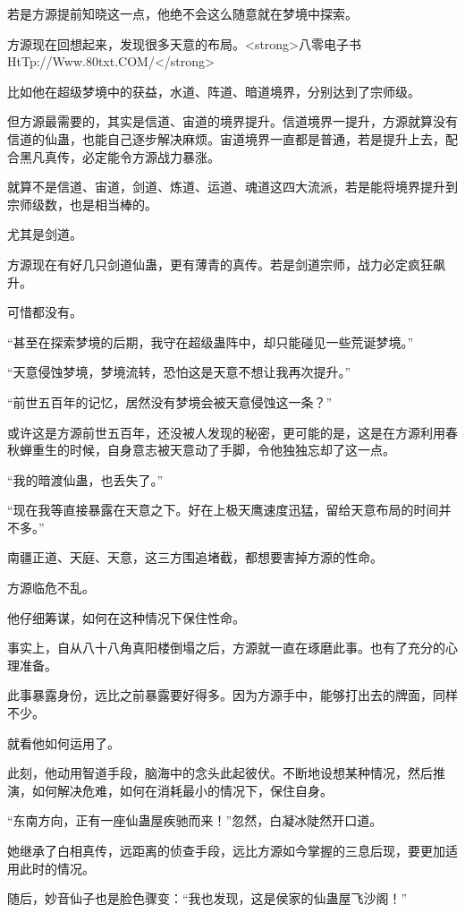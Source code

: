 \begin{this_body}
若是方源提前知晓这一点，他绝不会这么随意就在梦境中探索。

方源现在回想起来，发现很多天意的布局。<strong>八零电子书HtTp://Www.80txt.COM/</strong>

比如他在超级梦境中的获益，水道、阵道、暗道境界，分别达到了宗师级。

但方源最需要的，其实是信道、宙道的境界提升。信道境界一提升，方源就算没有信道的仙蛊，也能自己逐步解决麻烦。宙道境界一直都是普通，若是提升上去，配合黑凡真传，必定能令方源战力暴涨。

就算不是信道、宙道，剑道、炼道、运道、魂道这四大流派，若是能将境界提升到宗师级数，也是相当棒的。

尤其是剑道。

方源现在有好几只剑道仙蛊，更有薄青的真传。若是剑道宗师，战力必定疯狂飙升。

可惜都没有。

“甚至在探索梦境的后期，我守在超级蛊阵中，却只能碰见一些荒诞梦境。”

“天意侵蚀梦境，梦境流转，恐怕这是天意不想让我再次提升。”

“前世五百年的记忆，居然没有梦境会被天意侵蚀这一条？”

或许这是方源前世五百年，还没被人发现的秘密，更可能的是，这是在方源利用春秋蝉重生的时候，自身意志被天意动了手脚，令他独独忘却了这一点。

“我的暗渡仙蛊，也丢失了。”

“现在我等直接暴露在天意之下。好在上极天鹰速度迅猛，留给天意布局的时间并不多。”

南疆正道、天庭、天意，这三方围追堵截，都想要害掉方源的性命。

方源临危不乱。

他仔细筹谋，如何在这种情况下保住性命。

事实上，自从八十八角真阳楼倒塌之后，方源就一直在琢磨此事。也有了充分的心理准备。

此事暴露身份，远比之前暴露要好得多。因为方源手中，能够打出去的牌面，同样不少。

就看他如何运用了。

此刻，他动用智道手段，脑海中的念头此起彼伏。不断地设想某种情况，然后推演，如何解决危难，如何在消耗最小的情况下，保住自身。

“东南方向，正有一座仙蛊屋疾驰而来！”忽然，白凝冰陡然开口道。

她继承了白相真传，远距离的侦查手段，远比方源如今掌握的三息后现，要更加适用此时的情况。

随后，妙音仙子也是脸色骤变：“我也发现，这是侯家的仙蛊屋飞沙阁！”


\end{this_body}
